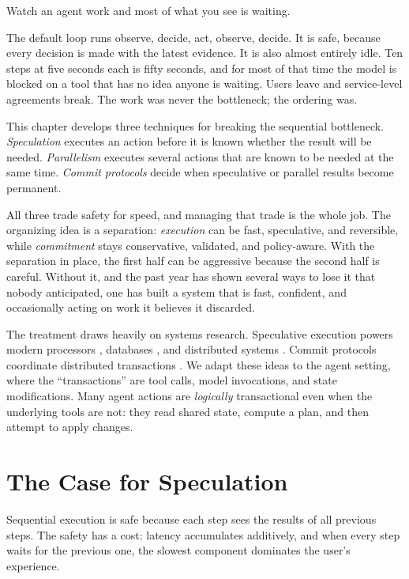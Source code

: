 \documentclass[11pt]{book}
\begin{document}
Watch an agent work and most of what you see is waiting.

The default loop runs observe, decide, act, observe, decide. It is safe, because every decision is made with the latest evidence. It is also almost entirely idle. Ten steps at five seconds each is fifty seconds, and for most of that time the model is blocked on a tool that has no idea anyone is waiting. Users leave and service-level agreements break. The work was never the bottleneck; the ordering was.

This chapter develops three techniques for breaking the sequential bottleneck. \emph{Speculation} executes an action before it is known whether the result will be needed. \emph{Parallelism} executes several actions that are known to be needed at the same time. \emph{Commit protocols} decide when speculative or parallel results become permanent.

All three trade safety for speed, and managing that trade is the whole job. The organizing idea is a separation: \textit{execution} can be fast, speculative, and reversible, while \textit{commitment} stays conservative, validated, and policy-aware. With the separation in place, the first half can be aggressive because the second half is careful. Without it, and the past year has shown several ways to lose it that nobody anticipated, one has built a system that is fast, confident, and occasionally acting on work it believes it discarded.

The treatment draws heavily on systems research. Speculative execution powers modern processors \cite{hennessy2017computer}, databases \cite{gray1992transaction}, and distributed systems \cite{nightingale2006speculative}. Commit protocols coordinate distributed transactions \cite{garciamolina1987sagas, mohan1986transaction}. We adapt these ideas to the agent setting, where the ``transactions'' are tool calls, model invocations, and state modifications. Many agent actions are \textit{logically} transactional even when the underlying tools are not: they read shared state, compute a plan, and then attempt to apply changes.

\section{The Case for Speculation}

Sequential execution is safe because each step sees the results of all previous steps. The safety has a cost: latency accumulates additively, and when every step waits for the previous one, the slowest component dominates the user's experience.
\end{document}

